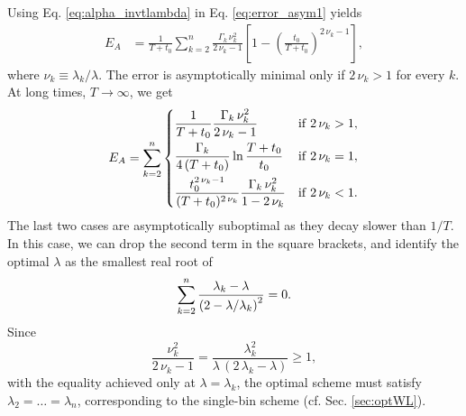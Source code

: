 \documentclass[preprint, floatfix]{revtex4-1}
\newcommand{\Err}{E}
\begin{document}
Using Eq. \eqref{eq:alpha_invtlambda}
in Eq. \eqref{eq:error_asym1} yields
%
\begin{align}
\Err_A
&=
\frac{    1    }
     { T + t_0 }
\sum_{k = 2}^n
  \frac{ \Gamma_k \, \nu_k^2 }
       {    2 \, \nu_k - 1   }
\left[
  1 - \left(
        \frac {     t_0 }
              { T + t_0 }
      \right)^{ 2 \, \nu_k - 1 }
\right],
\label{eq:error_asym_invt}
\end{align}
%
where $\nu_k \equiv \lambda_k / \lambda$.
%
The error is asymptotically minimal
only if $2\,\nu_k > 1$ for every $k$.
%
At long times, $T \to \infty$, we get
$$
\begin{aligned}
  \Err_A
  =
  \sum_{k = 2}^n
  \begin{dcases}
    \frac{    1    }
         { T + t_0 }
    \frac{ \Gamma_k \, \nu_k^2 }
         {   2 \, \nu_k - 1    }
    &
    \mathrm{if \;} 2 \, \nu_k > 1,
    \\%
    \frac{    \Gamma_k    }
         { 4 \, (T + t_0) }
    \ln \frac{ T + t_0 }
             {   t_0   }
    &
    \mathrm{if \;} 2 \, \nu_k = 1,
    \\
    \frac{  t_0^{ 2 \, \nu_k  - 1}  }
         { (T + t_0)^{ 2 \, \nu_k } }
    \frac{ \Gamma_k \, \nu_k^2 }
         {   1 - 2 \, \nu_k    }
    &
    \mathrm{if \;} 2 \, \nu_k < 1.
  \end{dcases}
\end{aligned}
$$
%
The last two cases
are asymptotically suboptimal
as they decay slower than $1/T$.
%
In this case,
we can drop the second term
in the square brackets,
and identify the optimal $\lambda$ as
the smallest real root of
%
\begin{equation}
  \sum_{k = 2}^n
    \frac { \lambda_k - \lambda }
          { \left(2 - \lambda/ \lambda_k \right)^2 }
  = 0.
\notag
\end{equation}
%
Since
$$
\frac{ \nu_k^2        }
     { 2 \, \nu_k - 1 }
=
\frac{ \lambda_k^2 }
     { \lambda \, (2 \, \lambda_k - \lambda) }
\ge 1
,
$$
with the equality achieved only at $\lambda = \lambda_k$,
the optimal scheme must satisfy
$\lambda_2 = \dots = \lambda_n$,
corresponding to the single-bin scheme
(cf. Sec. \ref{sec:optWL}).
\end{document}
